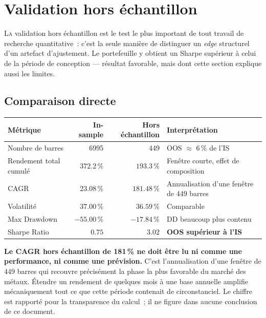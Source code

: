 \section{Validation hors échantillon}
\label{sec:out_of_sample}

\lettrine[lines=2, findent=2pt, nindent=0pt]{L}{a} validation hors échantillon est le test le plus important de tout travail de recherche quantitative~: c'est la seule manière de distinguer un \emph{edge} structurel d'un artefact d'ajustement. Le portefeuille y obtient un Sharpe supérieur à celui de la période de conception --- résultat favorable, mais dont cette section explique aussi les limites.

\subsection{Comparaison directe}

\begin{center}
\renewcommand{\arraystretch}{1.15}
\begin{tabular}{lrrl}
\toprule
\textbf{Métrique} & \textbf{In-sample} & \textbf{Hors échantillon} & \textbf{Interprétation} \\
\midrule
Nombre de barres & 6995 & 449 & OOS $\approx$ 6\,\% de l'IS \\
Rendement total cumulé & $372.2\,\%$ & $193.3\,\%$ & Fenêtre courte, effet de composition \\
CAGR & $23.08\,\%$ & $\mathbf{181.48\,\%}$ & Annualisation d'une fenêtre de 449 barres \\
Volatilité & $37.00\,\%$ & $36.59\,\%$ & Comparable \\
Max Drawdown & $-55.00\,\%$ & $\mathbf{-17.84\,\%}$ & DD beaucoup plus contenu \\
Sharpe Ratio & $0.75$ & $\mathbf{3.02}$ & \textbf{OOS supérieur à l'IS} \\
\bottomrule
\end{tabular}
\end{center}

\begin{warningbox}
\textbf{Le CAGR hors échantillon de 181\,\% ne doit être lu ni comme une performance, ni comme une prévision.} C'est l'annualisation d'une fenêtre de 449 barres qui recouvre précisément la phase la plus favorable du marché des métaux. Étendre un rendement de quelques mois à une base annuelle amplifie mécaniquement tout ce que cette période contenait de circonstanciel. Le chiffre est rapporté pour la transparence du calcul~; il ne figure dans aucune conclusion de ce document.
\end{warningbox}

